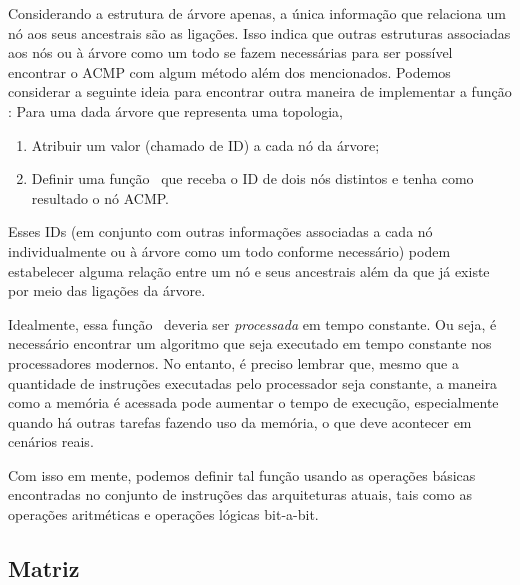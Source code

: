 



Considerando a estrutura de árvore apenas, a única informação que relaciona um nó aos seus ancestrais são as ligações.
Isso indica que outras estruturas associadas aos nós ou à árvore como um todo se fazem necessárias
para ser possível encontrar o ACMP com algum método além dos mencionados.
Podemos considerar a seguinte ideia para encontrar outra maneira de implementar a função \fACMP:
Para uma dada árvore que representa uma topologia,
\begin{enumerate}
	\item Atribuir um valor (chamado de ID) a cada nó da árvore;
	\item Definir uma função \ACMPIDs\ que receba o ID de dois nós distintos e tenha como resultado o nó ACMP.
\end{enumerate}
Esses IDs (em conjunto com outras informações associadas a cada nó individualmente ou à árvore como um todo conforme necessário)
podem estabelecer alguma relação entre um nó e seus ancestrais além da que já existe por meio das ligações da árvore.

Idealmente, essa função \ACMPIDs\ deveria ser \textit{processada} em tempo constante.
Ou seja, é necessário encontrar um algoritmo que seja executado em tempo constante nos processadores modernos.
No entanto, é preciso lembrar que, mesmo que a quantidade de instruções executadas pelo processador seja constante,
a maneira como a memória é acessada pode aumentar o tempo de execução, especialmente quando há outras tarefas fazendo uso da memória, o que deve acontecer em cenários reais.

Com isso em mente, podemos definir tal função usando as operações básicas encontradas no conjunto de instruções das arquiteturas atuais,
tais como as operações aritméticas e operações lógicas bit-a-bit.

\subsection{Matriz}


